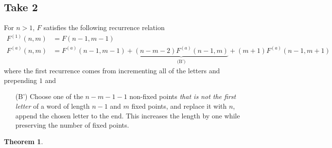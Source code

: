 \documentclass{article}
\newtheorem{theorem}[theo]{Theorem}
\begin{document}
\subsection{Take 2}
  For $n > 1$, $F$ satisfies the following recurrence relation \begin{align}
    F^{(1)}(n, m) &= F(n-1, m-1) \\
    F^{(a)}(n, m) &=
      F^{(a)}(n-1, m-1) +
      \underbrace{(n - m - 2)F^{(a)}(n - 1, m)}_{\text{(B')}} +
      (m + 1)F^{(a)}(n-1, m + 1)
  \end{align} where the first recurrence comes from incrementing all of the letters and prepending $1$ and \begin{enumerate}[(B)]
    \item[(B')] Choose one of the $n - m - 1 - 1$ non-fixed points \textit{that is not the first letter} of a word of length $n-1$ and $m$
    fixed points, and replace it with $n$, append the chosen letter to the end.
    This increases the length by one while preserving the number of fixed points.
  \end{enumerate}
  \begin{theorem}
  \end{theorem}
\end{document}
